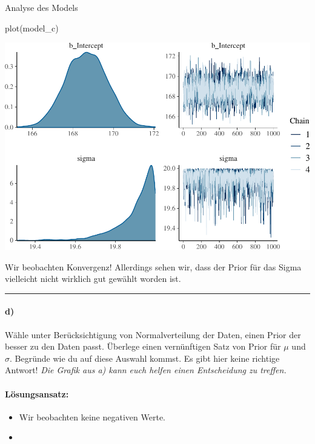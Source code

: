 \documentclass[
]{article}
\newenvironment{Shaded}{\begin{snugshade}}{\end{snugshade}}
\newcommand{\FunctionTok}[1]{\textcolor[rgb]{0.00,0.00,0.00}{#1}}
\newcommand{\NormalTok}[1]{#1}
\providecommand{\tightlist}{%
  \setlength{\itemsep}{0pt}\setlength{\parskip}{0pt}}
\begin{document}
Analyse des Models

\begin{Shaded}
\begin{Highlighting}[]
\FunctionTok{plot}\NormalTok{(model\_c)}
\end{Highlighting}
\end{Shaded}

\includegraphics{Loesung-Zettel-2_files/figure-latex/unnamed-chunk-4-1.pdf}

Wir beobachten Konvergenz! Allerdings sehen wir, dass der Prior für das
Sigma vielleicht nicht wirklich gut gewählt worden ist.

\begin{center}\rule{0.5\linewidth}{0.5pt}\end{center}

\hypertarget{d}{%
\paragraph{d)}\label{d}}

Wähle unter Berücksichtigung von Normalverteilung der Daten, einen Prior
der besser zu den Daten passt. Überlege einen vernünftigen Satz von
Prior für \(\mu\) und \(\sigma\). Begründe wie du auf diese Auswahl
kommst. Es gibt hier keine richtige Antwort!
\textit{Die Grafik aus a) kann euch helfen einen Entscheidung zu treffen.}

\hypertarget{luxf6sungsansatz-3}{%
\paragraph{Lösungsansatz:}\label{luxf6sungsansatz-3}}

\begin{itemize}
\tightlist
\item
  Wir beobachten keine negativen Werte.
\item
\end{itemize}
\end{document}
